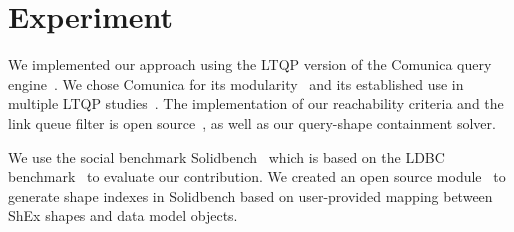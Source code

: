 \section{Experiment}





We implemented our approach using the LTQP version of the Comunica query engine~\cite{taelman_iswc_resources_comunica_2018}. 
We chose Comunica for its modularity~\cite{taelman_swj_componentsjs_2022} and its established use in multiple LTQP studies~\cite{Bogaerts2021LinkTW, Taelman2023, eschauzier_quweda_linkqueue_2023, Hanski2024, eschauzier_amw_rcubemetric_2024, tam2024opportunitiesshapebasedoptimizationlink}.
The implementation of our reachability criteria and the link queue filter is open source~, as well as our query-shape containment solver.~

We use the social benchmark Solidbench~\cite{Taelman2023} which is based on the LDBC benchmark~\cite{Angles2020} to evaluate our contribution.
We created an open source module~ to generate shape indexes in Solidbench based on user-provided mapping between ShEx shapes and data model objects.

